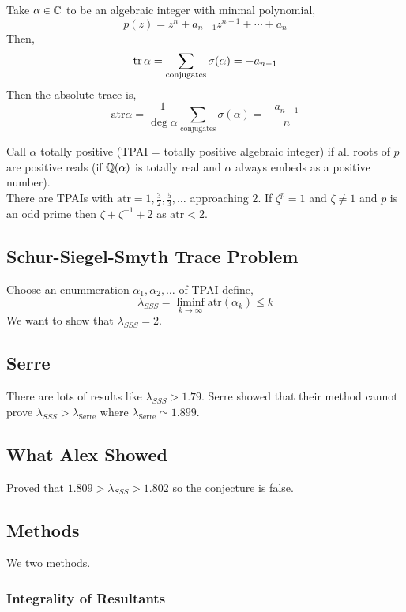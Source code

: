 \documentclass[12pt]{article}
\newcommand{\atr}{\mathrm{atr}}
\begin{document}
\begin{defn}
Take $\alpha \in \mathbb{C}$ to be an algebraic integer with minmal polynomial,
\[ p(z) = z^n + a_{n-1} z^{n-1} + \cdots + a_n \]
Then,
\[ \operatorname{\mathrm{tr}}{\alpha} = \sum_{\text{conjugates}} \sigma(\alpha) = - a_{n-1} \]
Then the absolute trace is,
\[ \atr{\alpha} = \frac{1}{\deg{\alpha}}\sum_{\text{conjugates}} \sigma(\alpha) = - \frac{a_{n-1}}{n} \]
\end{defn}

Call $\alpha$ totally positive (TPAI = totally positive algebraic integer) if all roots of $p$ are positive reals (if $\mathbb{Q}(\alpha)$ is totally real and $\alpha$ always embeds as a positive number). 
\bigskip\\
There are TPAIs with $\atr = 1, \frac{3}{2}, \frac{5}{3}, \dots$ approaching $2$. If $\zeta^p = 1$ and $\zeta \neq 1$ and $p$ is an odd prime then $\zeta + \zeta^{-1} + 2$ as $\atr < 2$.

\subsection{Schur-Siegel-Smyth Trace Problem}

Choose an enummeration $\alpha_1, \alpha_2, \dots$ of TPAI define,
\[ \lambda_{SSS} = \liminf_{k \to \infty} \atr(\alpha_k) \le k \]
We want to show that $\lambda_{SSS} = 2$.

\subsection{Serre}

There are lots of results like $\lambda_{SSS} > 1.79$. Serre showed that their method cannot prove $\lambda_{SSS} > \lambda_{\text{Serre}}$ where $\lambda_{\text{Serre}} \simeq 1.899$.

\subsection{What Alex Showed}

Proved that $1.809 > \lambda_{SSS} > 1.802$ so the conjecture is false.

\subsection{Methods}

We two methods.

\subsubsection{Integrality of Resultants}
\end{document}
